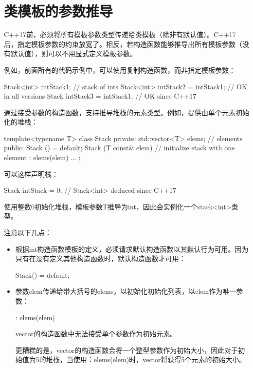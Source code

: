 \section{类模板的参数推导}

C++17前，必须将所有模板参数类型传递给类模板（除非有默认值）。C++17后，指定模板参数的约束放宽了。相反，若构造函数能够推导出所有模板参数（没有默认值），则可以不用显式定义模板参数。

例如，前面所有的代码示例中，可以使用复制构造函数，而非指定模板参数：

\begin{cpp}
Stack<int> intStack1; // stack of ints
Stack<int> intStack2 = intStack1; // OK in all versions
Stack intStack3 = intStack1; // OK since C++17
\end{cpp}

通过接受参数的构造函数，支持推导堆栈的元素类型。例如，提供由单个元素初始化的堆栈：

\begin{cpp}
template<typename T>
class Stack {
private:
	std::vector<T> elems; // elements
public:
	Stack () = default;
	Stack (T const& elem) // initialize stack with one element
	: elems({elem}) {
	}
	...
};
\end{cpp}

可以这样声明栈：

\begin{cpp}
Stack intStack = 0; // Stack<int> deduced since C++17
\end{cpp}

使用整数0初始化堆栈，模板参数T推导为int，因此会实例化一个stack<int>类型。

注意以下几点：

\begin{itemize}
\item 
根据int构造函数模板的定义，必须请求默认构造函数以其默认行为可用。因为只有在没有定义其他构造函数时，默认构造函数才可用：
\begin{cpp}
Stack() = default;
\end{cpp}

\item 
参数elem传递给带大括号的elems，以初始化初始化列表，以elem作为唯一参数：
\begin{cpp}
: elems({elem})
\end{cpp}
vector的构造函数中无法接受单个参数作为初始元素。

\begin{notice}
更糟糕的是，vector的构造函数会将一个整型参数作为初始大小，因此对于初始值为5的堆栈，当使用：elems(elem)时，vector将获得5个元素的初始大小。
\end{notice}

\end{itemize}

